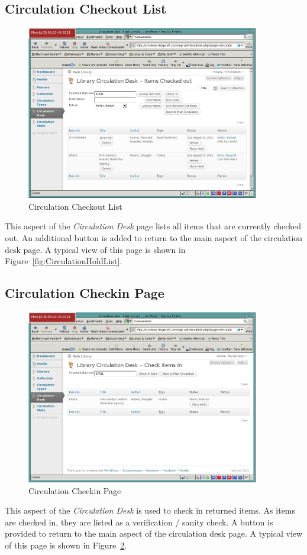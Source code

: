 \documentclass[letterpaper,twoside]{article}
\begin{document}
\subsection{Circulation Checkout List}
\label{sect:CirculationCheckoutList}

\begin{figure}[htbp]
\begin{centering}
\includegraphics[width=4in]{CirculationCheckoutList.png}
\caption{Circulation Checkout List}
\label{fig:CirculationCheckoutList}
\end{centering}
\end{figure}
This aspect of the \textit{Circulation Desk} page lists all items that
are currently checked out. An additional button is added to return to
the main aspect of the circulation desk page.  A typical view of this
page is shown in Figure~\ref{fig:CirculationHoldList}.


\subsection{Circulation Checkin Page}
\label{sect:CirculationCheckinPage}

\begin{figure}[htbp]
\begin{centering}
\includegraphics[width=4in]{CirculationCheckinPage.png}
\caption{Circulation Checkin Page}
\label{fig:CirculationCheckinPage}
\end{centering}
\end{figure}
This aspect of the \textit{Circulation Desk} is used to check in
returned items.  As items are checked in, they are listed as a
verification / sanity check. A button is provided to return to 
the main aspect of the circulation desk page.  A typical view of this   
page is shown in Figure~\ref{fig:CirculationCheckinPage}.
\end{document}
